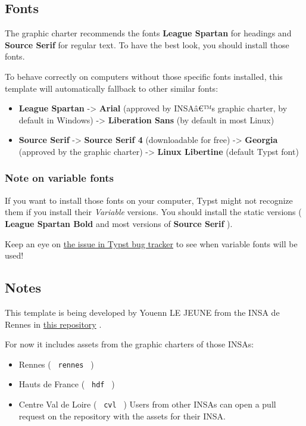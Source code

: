 \subsection{Fonts}\label{fonts}

The graphic charter recommends the fonts \textbf{League Spartan} for
headings and \textbf{Source Serif} for regular text. To have the best
look, you should install those fonts.

To behave correctly on computers without those specific fonts installed,
this template will automatically fallback to other similar fonts:

\begin{itemize}
\tightlist
\item
  \textbf{League Spartan} -\textgreater{} \textbf{Arial} (approved by
  INSAâ€™s graphic charter, by default in Windows) -\textgreater{}
  \textbf{Liberation Sans} (by default in most Linux)
\item
  \textbf{Source Serif} -\textgreater{} \textbf{Source Serif 4}
  (downloadable for free) -\textgreater{} \textbf{Georgia} (approved by
  the graphic charter) -\textgreater{} \textbf{Linux Libertine} (default
  Typst font)
\end{itemize}

\subsubsection{Note on variable fonts}\label{note-on-variable-fonts}

If you want to install those fonts on your computer, Typst might not
recognize them if you install their \emph{Variable} versions. You should
install the static versions ( \textbf{League Spartan Bold} and most
versions of \textbf{Source Serif} ).

Keep an eye on \href{https://github.com/typst/typst/issues/185}{the
issue in Typst bug tracker} to see when variable fonts will be used!

\subsection{Notes}\label{notes}

This template is being developed by Youenn LE JEUNE from the INSA de
Rennes in \href{https://github.com/SkytAsul/INSA-Typst-Template}{this
repository} .

For now it includes assets from the graphic charters of those INSAs:

\begin{itemize}
\tightlist
\item
  Rennes ( \texttt{\ rennes\ } )
\item
  Hauts de France ( \texttt{\ hdf\ } )
\item
  Centre Val de Loire ( \texttt{\ cvl\ } ) Users from other INSAs can
  open a pull request on the repository with the assets for their INSA.
\end{itemize}

